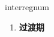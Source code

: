 
\begin{frame}
{\huge interregnum}
\begin{center}
\begin{enumerate}\Large
  \item \textbf{过渡期}
\end{enumerate}
\end{center}
\end{frame}
